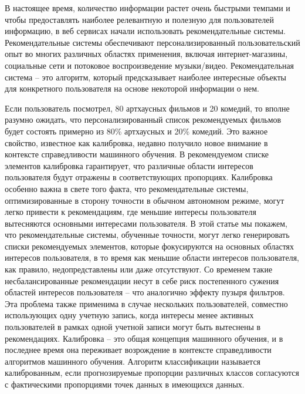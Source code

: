 \documentclass[a4paper,article,14pt]{extarticle}
\begin{document}


\tableofcontents
\pagebreak


В настоящее время, количество информации растет очень быстрыми темпами и чтобы предоставлять наиболее релевантную и полезную для пользователей информацию, 
в веб сервисах начали использовать рекомендательные системы.  Рекомендательные системы обеспечивают персонализированный пользовательский опыт во многих различных областях применения, включая интернет-магазины, социальные сети и потоковое воспроизведение музыки/видео.  
Рекомендательная система -- это алгоритм, который предсказывает наиболее интересные
 объекты для конкретного пользователя на основе некоторой информации о нем.

 Если пользователь посмотрел, 80 артхаусных фильмов и 20 комедий, то вполне разумно ожидать, что персонализированный список рекомендуемых фильмов будет состоять примерно из 80\% артхаусных и 20\% комедий. Это важное свойство, известное как калибровка, недавно получило новое внимание в контексте справедливости машинного обучения. В рекомендуемом списке элементов калибровка гарантирует, что различные области интересов пользователя будут отражены в соответствующих пропорциях. Калибровка особенно важна в свете того факта, что рекомендательные системы, оптимизированные в сторону точности
  в обычном автономном режиме, могут легко привести к рекомендациям, где меньшие интересы пользователя вытесняются основными интересами пользователя.
 В этой статье мы покажем, что рекомендательные системы, обученные точности, могут легко генерировать списки рекомендуемых элементов, которые фокусируются на основных областях интересов пользователя, в то время как меньшие области интересов пользователя, как правило, недопредставлены или даже отсутствуют. 
 Со временем такие несбалансированные рекомендации несут в себе риск постепенного сужения областей интересов пользователя -- что аналогично эффекту пузыря фильтров. Эта проблема также применима в случае нескольких пользователей, совместно использующих одну учетную запись, когда интересы менее активных пользователей в рамках одной учетной записи могут быть вытеснены в рекомендациях.
 Калибровка -- это общая концепция машинного обучения, и в последнее время она переживает возрождение в контексте справедливости алгоритмов машинного обучения. Алгоритм классификации называется калиброванным, если прогнозируемые пропорции различных классов согласуются с фактическими пропорциями точек данных в имеющихся данных. 
\end{document}
